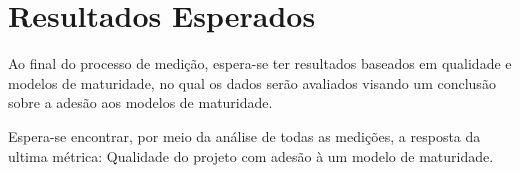 \chapter{Resultados Esperados}

Ao final do processo de medição, espera-se ter resultados baseados em qualidade e modelos de maturidade, no qual os dados serão avaliados visando um conclusão sobre a adesão aos modelos de maturidade.
        
Espera-se encontrar, por meio da análise de todas as medições, a resposta da ultima métrica: Qualidade do projeto com adesão à um modelo de maturidade.
